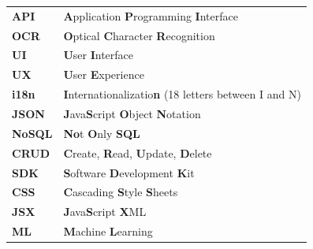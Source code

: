 
\addchaptertocentry{\abbrevname}

\begin{center}
{\Large\textbf{\abbrevname}}
\end{center}
\vspace{6mm}

\begin{center}
\begin{tabular}{ll}
\textbf{API} & \textbf{A}pplication \textbf{P}rogramming  \textbf{I}nterface \\
\textbf{OCR} & \textbf{O}ptical \textbf{C}haracter \textbf{R}ecognition \\
\textbf{UI} & \textbf{U}ser \textbf{I}nterface \\
\textbf{UX} & \textbf{U}ser \textbf{E}xperience \\
\textbf{i18n} & \textbf{I}nternationalizatio\textbf{n} (18 letters between I and N) \\
\textbf{JSON} & \textbf{J}ava\textbf{S}cript \textbf{O}bject \textbf{N}otation \\
\textbf{NoSQL} & \textbf{No}t \textbf{O}nly \textbf{SQL} \\
\textbf{CRUD} & \textbf{C}reate, \textbf{R}ead, \textbf{U}pdate, \textbf{D}elete \\
\textbf{SDK} & \textbf{S}oftware \textbf{D}evelopment \textbf{K}it \\
\textbf{CSS} & \textbf{C}ascading \textbf{S}tyle \textbf{S}heets \\
\textbf{JSX} & \textbf{J}ava\textbf{S}cript \textbf{X}ML \\
\textbf{ML} & \textbf{M}achine \textbf{L}earning \\
\end{tabular}
\end{center}

\vfill

